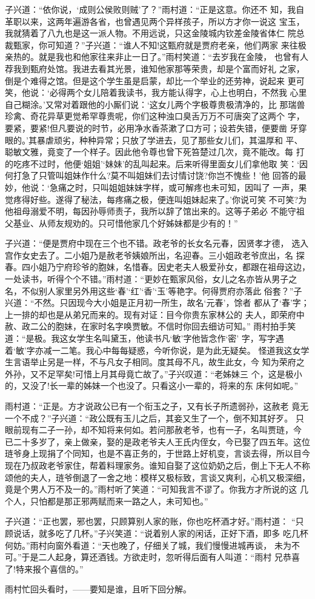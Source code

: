 子兴道：“依你说，‘成则公侯败则贼’了？”雨村道：“正是这意。你还不
知，我自革职以来，这两年遍游各省，也曾遇见两个异样孩子，所以方才你一说这
宝玉，我就猜着了八九也是这一派人物。不用远说，只这金陵城内钦差金陵省体仁
院总裁甄家，你可知道？”子兴道：“谁人不知!这甄府就是贾府老亲，他们两家
来往极亲热的。就是我也和他家往来非止一日了。”雨村笑道：“去岁我在金陵，
也曾有人荐我到甄府处馆。我进去看其光景，谁知他家那等荣贵，却是个富而好礼
之家，倒是个难得之馆。但是这个学生虽是启蒙，却比一个举业的还劳神，说起来
更可笑，他说：‘必得两个女儿陪着我读书，我方能认得字，心上也明白，不然我
心里自己糊涂。’又常对着跟他的小厮们说：‘这女儿两个字极尊贵极清净的，比
那瑞兽珍禽、奇花异草更觉希罕尊贵呢，你们这种浊口臭舌万万不可唐突了这两个
字，要紧，要紧!但凡要说的时节，必用净水香茶漱了口方可；设若失错，便要凿
牙穿眼的。’其暴虐顽劣，种种异常；只放了学进去，见了那些女儿们，其温厚和
平、聪敏文雅，竟变了一个样子。因此他令尊也曾下死笞楚过几次，竟不能改。每
打的吃疼不过时，他便‘姐姐’‘妹妹’的乱叫起来。后来听得里面女儿们拿他取
笑：‘因何打急了只管叫姐妹作什么?莫不叫姐妹们去讨情讨饶?你岂不愧些！’他
回答的最妙，他说：‘急痛之时，只叫姐姐妹妹字样，或可解疼也未可知，因叫了
一声，果觉疼得好些。遂得了秘法，每疼痛之极，便连叫姐妹起来了。’你说可笑
不可笑?为他祖母溺爱不明，每因孙辱师责子，我所以辞了馆出来的。这等子弟必
不能守祖父基业、从师友规劝的。只可惜他家几个好姊妹都是少有的！”

子兴道：“便是贾府中现在三个也不错。政老爷的长女名元春，因贤孝才德，
选入宫作女史去了。二小姐乃是赦老爷姨娘所出，名迎春。三小姐政老爷庶出，名
探春。四小姐乃宁府珍爷的胞妹，名惜春。因史老夫人极爱孙女，都跟在祖母这边，
一处读书，听得个个不错。”雨村道：“更妙在甄家风俗，女儿之名亦皆从男子之
名，不似别人家里另外用这些‘春’‘红’‘香’‘玉’等艳字。何得贾府亦落此
俗套？”子兴道：“不然。只因现今大小姐是正月初一所生，故名‘元春’，馀者
都从了‘春’字；上一排的却也是从弟兄而来的。现有对证：目今你贵东家林公的
夫人，即荣府中赦、政二公的胞妹，在家时名字唤贾敏。不信时你回去细访可知。”
雨村拍手笑道：“是极。我这女学生名叫黛玉，他读书凡‘敏’字他皆念作‘密’
字，写字遇着‘敏’字亦减一二笔。我心中每每疑惑，今听你说，是为此无疑矣。
怪道我这女学生言语举止另是一样，不与凡女子相同。度其母不凡，故生此女，今
知为荣府之外孙，又不足罕矣!可惜上月其母竟亡故了。”子兴叹道：“老姊妹三
个，这是极小的，又没了!长一辈的姊妹一个也没了。只看这小一辈的，将来的东
床何如呢。”

雨村道：“正是。方才说政公已有一个衔玉之子，又有长子所遗弱孙，这赦老
竟无一个不成？”子兴道：“政公既有玉儿之后，其妾又生了一个，倒不知其好歹。
只眼前现有二子一孙，却不知将来何如。若问那赦老爷，也有一子，名叫贾琏，今
已二十多岁了，亲上做亲，娶的是政老爷夫人王氏内侄女，今已娶了四五年。这位
琏爷身上现捐了个同知，也是不喜正务的，于世路上好机变，言谈去得，所以目今
现在乃叔政老爷家住，帮着料理家务。谁知自娶了这位奶奶之后，倒上下无人不称
颂他的夫人，琏爷倒退了一舍之地：模样又极标致，言谈又爽利，心机又极深细，
竟是个男人万不及一的。”雨村听了笑道：“可知我言不谬了。你我方才所说的这
几个人，只怕都是那正邪两赋而来一路之人，未可知也。”

子兴道：“正也罢，邪也罢，只顾算别人家的账，你也吃杯酒才好。”雨村道：
“只顾说话，就多吃了几杯。”子兴笑道：“说着别人家的闲话，正好下酒，即多
吃几杯何妨。”雨村向窗外看道：“天也晚了，仔细关了城，我们慢慢进城再谈，
未为不可。”于是二人起身，算还酒钱。方欲走时，忽听得后面有人叫道：“雨村
兄恭喜了!特来报个喜信的。”

雨村忙回头看时，——要知是谁，且听下回分解。